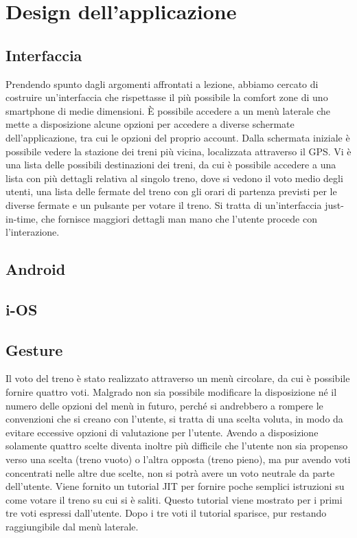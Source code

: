 \chapter{Design dell'applicazione\label{sec:design}}

\section{Interfaccia\label{sec:interfaccia}}
Prendendo spunto dagli argomenti affrontati a lezione, abbiamo cercato di costruire un'interfaccia che rispettasse il più possibile la comfort zone di uno smartphone di medie dimensioni.
È possibile accedere a un menù laterale che mette a disposizione alcune opzioni per accedere a diverse schermate dell'applicazione, tra cui le opzioni del proprio account.
Dalla schermata iniziale è possibile vedere la stazione dei treni più vicina, localizzata attraverso il GPS.
Vi è una lista delle possibili destinazioni dei treni, da cui è possibile accedere a una lista con più dettagli relativa al singolo treno, dove si vedono il voto medio degli utenti, una lista delle fermate del treno con gli orari di partenza previsti per le diverse fermate e un pulsante per votare il treno.
Si tratta di un'interfaccia just-in-time, che fornisce maggiori dettagli man mano che l'utente procede con l'interazione.

\section{Android\label{sec:android}}

\section{i-OS\label{sec:i-os}}

\section{Gesture\label{sec:gesture}}
Il voto del treno è stato realizzato attraverso un menù circolare, da cui è possibile fornire quattro voti.
Malgrado non sia possibile modificare la disposizione né il numero delle opzioni del menù in futuro, perché si andrebbero a rompere le convenzioni che si creano con l'utente, si tratta di una scelta voluta, in modo da evitare eccessive opzioni di valutazione per l'utente.
Avendo a disposizione solamente quattro scelte diventa inoltre più difficile che l'utente non sia propenso verso una scelta (treno vuoto) o l'altra opposta (treno pieno), ma pur avendo voti concentrati nelle altre due scelte, non si potrà avere un voto neutrale da parte dell'utente.
Viene fornito un tutorial JIT per fornire poche semplici istruzioni su come votare il treno su cui si è saliti.
Questo tutorial viene mostrato per i primi tre voti espressi dall'utente.
Dopo i tre voti il tutorial sparisce, pur restando raggiungibile dal menù laterale.

